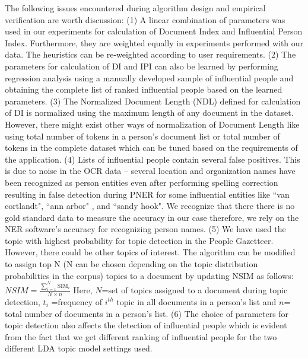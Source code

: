 The following issues encountered during algorithm design and empirical verification are worth discussion:
(1)  A linear combination of parameters was used in our experiments for calculation of Document Index and Influential Person Index. Furthermore, they are weighted equally in experiments performed with our data. The heuristics can be re-weighted according to user requirements. 
(2) The parameters for calculation of DI and IPI can also be learned by performing regression analysis using a manually developed sample of influential people and obtaining the complete list of ranked influential people based on the learned parameters.
(3) The Normalized Document Length (NDL) defined for calculation of DI is normalized using the maximum length of any document in the dataset. However, there might exist other ways of normalization of Document Length like using total number of tokens in a person's document list or total number of tokens in the complete dataset which can be tuned based on the requirements of the application.
(4) Lists of influential people contain several false positives. This is due to noise in the OCR data -- several location and organization names have been recognized as person entities even after performing spelling correction resulting in false detection during PNER for some influential entities like ``van cortlandt", ``ann arbor" ,  and ``sandy hook". We recognize that there there is no gold standard data to measure the accuracy in our case therefore, we rely on the NER software's accuracy for recognizing person names.
(5) We have used the topic with highest probability for topic detection in the People Gazetteer. However, there could be other topics of interest. The algorithm can be modified to assign top N (N can be chosen depending on the topic distribution probabilities in the corpus) topics to a document by updating NSIM as follows: 
 $NSIM=  \frac{\sum_{i=1}^{N}\text{SIM}_i} { N\times n}$
Here, $N$=set of topics assigned to a document during topic detection,  $t_i$ =frequency of $i^{th}$ topic in all documents in a person's list and $n$= total number of documents in a person's list.
(6) The choice of parameters for topic detection also affects the detection of influential people which is evident from the fact that we get different ranking of influential people for the two different LDA topic model settings used. 





